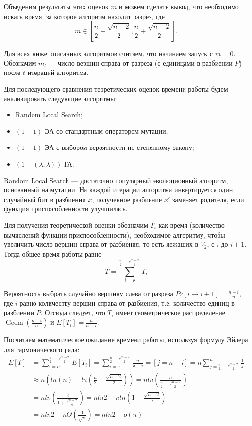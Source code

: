 \documentclass[times]{itmo-student-thesis}
\newcommand{\alglambdaf}{${(1 + (\lambda , \lambda))}$-ГА\xspace}
\newcommand{\oea}{\mbox{$(1 + 1)$-ЭА}\xspace}
\DeclareMathOperator{\Geom}{Geom}
\begin{document}
Объеденим результаты этих оценок $m$ и можем сделать вывод, что необходимо искать время, за которое алгоритм находит разрез, где
$$
m \in \left[\frac{n}{2} -\frac{\sqrt{n-2}}{2},  \frac{n}{2} + \frac{\sqrt{n-2}}{2}\right].
$$

Для всех ниже описанных алгоритмов считаем, что начинаем запуск с $m = 0$. Обозначим $m_t$ --- число вершин справа от разреза (с единицами в разбиении $P$) после $t$ итераций алгоритма.

Для последующего сравнения теоретических оценок времени работы будем анализировать следующие алгоритмы:
\begin{itemize}
  \item Random Local Search;
  \item \oea со стандартным оператором мутации;
  \item \oea с выбором вероятности по степенному закону;
  \item \alglambdaf.
\end{itemize}
Random Local Search --- достаточно популярный эволюционный алгоритм, основанный на мутации. На каждой итерации алгоритма инвертируется один случайный бит в разбиении $x$, полученное разбиение $x'$ заменяет родителя, если функция приспособленности улучшилась.

Для получения теоретической оценки обозначим $T_i$ как время (количество вычислений функции приспособленности), необходимое алгоритму, чтобы увеличить число вершин справа от разбиения, то есть лежащих в $V_2$, с $i$ до $i + 1$.
Тогда общее время работы равно
$$
  T = \sum_{i=o}^{\frac{n}{2} - \frac{\sqrt{n-2}}{2}} T_i
$$

Вероятность выбрать случайно вершину слева от разреза $Pr[i \rightarrow i + 1] = \frac{n-i}{n}$, где $i$ равно количеству вершин справа от разбиения, т.е. количество единиц в разбиении $P$.
Отсюда следует, что  $T_i$ имеет геометрическое распределение $\Geom(\frac{n-i}{n})$ и $E[T_i] = \frac{n}{n-i}$.

Посчитаем математическое ожидание времени работы, используя формулу Эйлера для гармонического ряда:
\begin{align*}
    E[T] &=
                \sum_{i=o}^{\frac{n}{2} - \frac{\sqrt{n-2}}{2}} E[T_i] =
                \sum_{i=o}^{\frac{n}{2} - \frac{\sqrt{n-2}}{2}} \frac{n}{n-i} = [j = n - i] = n \sum_{j=\frac{n}{2} + \frac{\sqrt{n-2}}{2}}^{n} \frac{1}{j}  \\
        &\approx
                n\left(ln(n) - ln\left(\frac{n}{2} + \frac{\sqrt{n-2}}{2}\right)\right) =
                n ln\left(\frac{n}{\frac{n}{2} + \frac{\sqrt{n-2}}{2}}\right) \\
        &=
                n ln\left(\frac{2}{1 + \frac{\sqrt{n-2}}{n}}\right) = nln2 - nln\left(1 + \frac{\sqrt{n-2}}{n}\right) \\
        &= nln2 - n\Theta\left(\frac{1}{\sqrt{n}}\right) = nln2 - o(n)
\end{align*}
\end{document}
